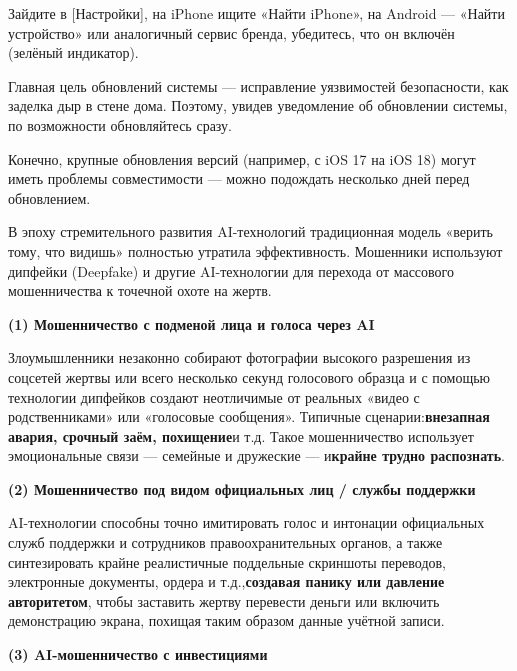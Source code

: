 Зайдите в [Настройки], на iPhone ищите «Найти iPhone», на Android — «Найти устройство» или аналогичный сервис бренда, убедитесь, что он включён (зелёный индикатор).


Главная цель обновлений системы — исправление уязвимостей безопасности, как заделка дыр в стене дома. Поэтому, увидев уведомление об обновлении системы, по возможности обновляйтесь сразу.

Конечно, крупные обновления версий (например, с iOS 17 на iOS 18) могут иметь проблемы совместимости — можно подождать несколько дней перед обновлением.


В эпоху стремительного развития AI-технологий традиционная модель «верить тому, что видишь» полностью утратила эффективность. Мошенники используют дипфейки (Deepfake) и другие AI-технологии для перехода от массового мошенничества к точечной охоте на жертв.


\textbf{(1) Мошенничество с подменой лица и голоса через AI}\par

Злоумышленники незаконно собирают фотографии высокого разрешения из соцсетей жертвы или всего несколько секунд голосового образца и с помощью технологии дипфейков создают неотличимые от реальных «видео с родственниками» или «голосовые сообщения». Типичные сценарии:\textbf{внезапная авария, срочный заём, похищение}и т.д. Такое мошенничество использует эмоциональные связи — семейные и дружеские — и\textbf{крайне трудно распознать}.

\textbf{(2) Мошенничество под видом официальных лиц / службы поддержки}\par

AI-технологии способны точно имитировать голос и интонации официальных служб поддержки и сотрудников правоохранительных органов, а также синтезировать крайне реалистичные поддельные скриншоты переводов, электронные документы, ордера и т.д.,\textbf{создавая панику или давление авторитетом}, чтобы заставить жертву перевести деньги или включить демонстрацию экрана, похищая таким образом данные учётной записи.

\textbf{(3) AI-мошенничество с инвестициями}\par

